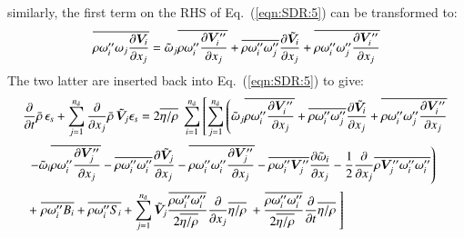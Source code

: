 \documentclass{warpdoc}
\newcommand{\alb}{\vspace{0.2cm}\\} %
\newcommand{\nd}{{{n}_{\rm d}}}
\newcommand{\mfd}{\displaystyle}
\begin{document}
%
similarly, the first term on the RHS of Eq.\ (\ref{eqn:SDR:5}) can be transformed to:
%
\begin{displaymath}
  \overline{\rho  \omega_i^{\prime\prime}  \omega_j  \frac{\partial \bm{V}_i}{\partial x_j}}
   = {\tilde{\omega}_j} \overline{\rho  \omega_i^{\prime\prime}  \frac{\partial \bm{V}_i^{\prime\prime}}{\partial x_j}}
       + \overline{\rho  \omega_i^{\prime\prime}  \omega_j^{\prime\prime}} \frac{\partial {\tilde{\bm{V}}_i}}{\partial x_j}
       + \overline{\rho  \omega_i^{\prime\prime}  \omega_j^{\prime\prime} \frac{\partial \bm{V}_i^{\prime\prime}}{\partial x_j}}
\end{displaymath}
%
The two latter are inserted back into Eq.\ (\ref{eqn:SDR:5}) to give:
%
%
\begin{equation}
 \begin{array}{l}
         \mfd \frac{\partial }{\partial t} \wbar{\rho}\, \epsilon_s
        +\mfd\sum_{j=1}^{\nd}
           \frac{\partial }{\partial x_j} \wbar{\rho}\, {\wtilde{\bm{V}}_j} \epsilon_s
 = 
   2 \overline{\eta/\rho}~ \mfd\sum_{i=1}^{\nd} \left[ \mfd\sum_{j=1}^{\nd}
    \mfd\left(
         {\wtilde{\omega}_j} \overline{\rho  \omega_i^{\prime\prime}  \frac{\partial \bm{V}_i^{\prime\prime}}{\partial x_j}}
             + \overline{\rho  \omega_i^{\prime\prime}  \omega_j^{\prime\prime}} \frac{\partial {\wtilde{\bm{V}}_i}}{\partial x_j}
             + \overline{\rho  \omega_i^{\prime\prime}  \omega_j^{\prime\prime} \frac{\partial \bm{V}_i^{\prime\prime}}{\partial x_j}}
    \right. \right.\alb~~
    \mfd\left.
       - {\wtilde{\omega}_i} \overline{\rho  \omega_i^{\prime\prime}  \frac{\partial \bm{V}_j^{\prime\prime}}{\partial x_j}}
             - \overline{\rho  \omega_i^{\prime\prime}  \omega_i^{\prime\prime}} \frac{\partial {\wtilde{\bm{V}}_j}}{\partial x_j}
             - \overline{\rho  \omega_i^{\prime\prime}  \omega_i^{\prime\prime} \frac{\partial \bm{V}_j^{\prime\prime}}{\partial x_j}}
       - \overline{\rho \omega_i^{\prime\prime} \bm{V}_j^{\prime\prime}}  \frac{\partial {\wtilde{\omega}_i}}{\partial x_j}
       - \frac{1}{2} \frac{\partial }{\partial x_j} \overline{\rho {\bm{V}_j^{\prime\prime}} \omega_i^{\prime\prime} \omega_i^{\prime\prime}}
    \right) \alb~~
 + \mfd\left.
         \mfd \overline{\rho \omega_i^{\prime\prime} B_i}
       + \overline{\rho \omega_i^{\prime\prime} S_i}
       + \sum_{j=1}^\nd{\wtilde{\bm{V}}_j} \frac{\overline{\rho \omega_i^{\prime\prime} \omega_i^{\prime\prime}}}{2 \overline{\eta/\rho}~} \frac{\partial }{\partial x_j}  \overline{\eta/\rho}~
       + \frac{\overline{\rho \omega_i^{\prime\prime} \omega_i^{\prime\prime}}}{2 \overline{\eta/\rho}~} \frac{\partial }{\partial t} \overline{\eta/\rho}~
    \right] 
 \end{array}
\label{eqn:SDR:final}
\end{equation}
%
\end{document}
